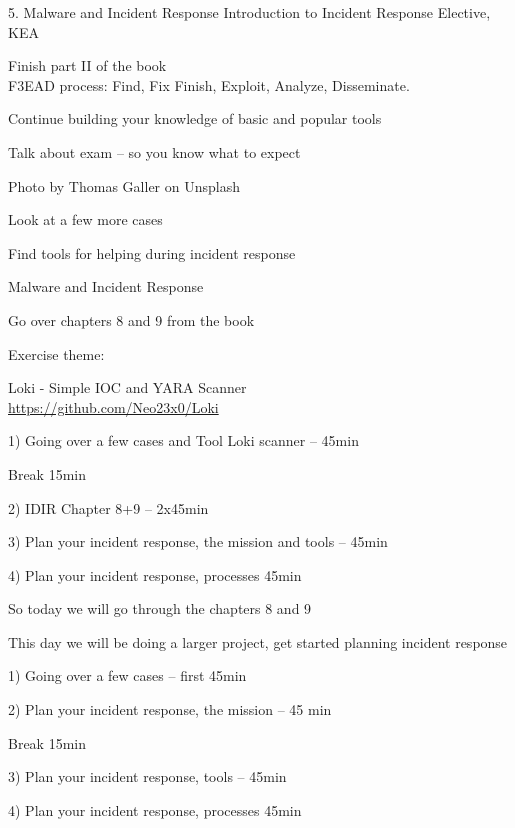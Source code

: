 \documentclass[Screen16to9,17pt]{foils}
\begin{document}
\mytitlepage
{5. Malware and Incident Response}
{Introduction to Incident Response Elective, KEA}




\begin{list2}
\item Finish part II of the book\\
F3EAD process: Find, Fix Finish, Exploit, Analyze, Disseminate.
\item Continue building your knowledge of basic and popular tools
\item Talk about exam -- so you know what to expect
\end{list2}

{\hfill \small Photo by Thomas Galler on Unsplash}


\begin{list2}
\item Look at a few more cases
\item Find tools for helping during incident response
\item Malware and Incident Response
\item Go over chapters 8 and 9 from the book
\end{list2}

Exercise theme:
\begin{list2}
\item Loki - Simple IOC and YARA Scanner\\
\url{https://github.com/Neo23x0/Loki}
\end{list2}


\begin{list2}
\item 1) Going over a few cases and Tool Loki scanner -- 45min
\item Break 15min
\item 2) IDIR Chapter 8+9 -- 2x45min
\item 3) Plan your incident response, the mission and tools -- 45min
\item 4) Plan your incident response, processes 45min
\end{list2}

So today we will go through the chapters 8 and 9


This day we will be doing a larger project, get started planning incident response
\begin{list2}
\item 1) Going over a few cases -- first 45min
\item 2) Plan your incident response, the mission -- 45 min
\item Break 15min
\item 3) Plan your incident response, tools -- 45min
\item 4) Plan your incident response, processes 45min
\end{list2}
\end{document}
